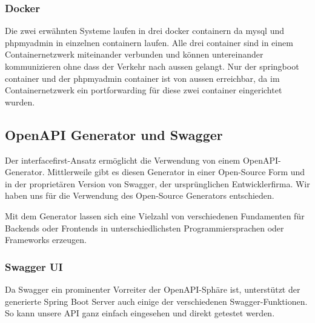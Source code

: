\documentclass[../main.tex]{subfiles}
\begin{document}
	\subsubsection{Docker}
	Die zwei erwähnten Systeme laufen in drei \gls{docker} \gls{container}n da \gls{mysql} und \gls{phpmyadmin} in einzelnen \gls{container}n laufen. Alle drei \gls{container} sind in einem Containernetzwerk miteinander verbunden und können untereinander kommunizieren ohne dass der Verkehr nach aussen gelangt. Nur der \gls{springboot} \gls{container} und der \gls{phpmyadmin} \gls{container} ist von aussen erreichbar, da im Containernetzwerk ein \gls{portforwarding} für diese zwei \gls{container} eingerichtet wurden.
	
	\subsection{OpenAPI Generator und Swagger}
	Der \gls{interfacefirst}-Ansatz ermöglicht die Verwendung von einem OpenAPI-Generator. Mittlerweile gibt es diesen Generator in einer Open-Source Form und in der proprietären Version von Swagger, der ursprünglichen Entwicklerfirma. Wir haben uns für die Verwendung des Open-Source Generators entschieden.
	
	\noindent Mit dem Generator lassen sich eine Vielzahl von verschiedenen Fundamenten für Backends oder Frontends in unterschiedlichsten Programmiersprachen oder Frameworks erzeugen.
	
	\subsubsection{Swagger UI}
	Da Swagger ein prominenter Vorreiter der OpenAPI-Sphäre ist, unterstützt der generierte Spring Boot Server auch einige der verschiedenen Swagger-Funktionen. So kann unsere API ganz einfach eingesehen und direkt getestet werden.
	
\end{document}
